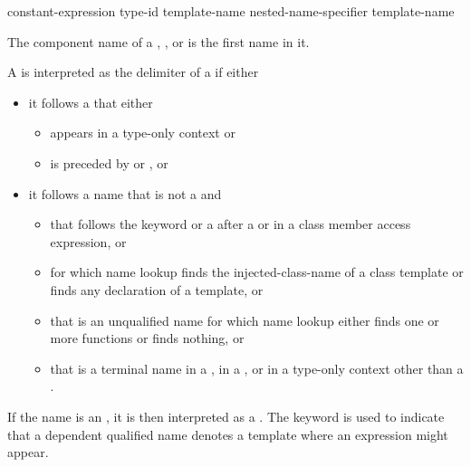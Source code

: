 \begin{bnf}
\br
  constant-expression\br
  type-id\br
   template-name\br
  nested-name-specifier  template-name
\end{bnf}

\pnum
{}%
The component name of a
,
, or
is the first name in it.

\pnum
A \tcode{<} is interpreted as the delimiter of
a 
if either
\begin{itemize}
\item
it follows a  that either
\begin{itemize}
\item appears in a type-only context or
\item is preceded by  or , or
\end{itemize}
\item
it follows a name that is not a  and
\begin{itemize}
\item
that follows the keyword  or a \tcode{\~}
after a  or
in a class member access expression, or
\item
for which name lookup finds the injected-class-name of a class template or
finds any declaration of a template, or
\item
that is an unqualified name
for which name lookup either finds one or more functions or finds nothing, or
\item
that is a terminal name
in a ,
in a , or
in a type-only context
other than a .
\end{itemize}
\end{itemize}
\begin{note}
If the name is an ,
it is then interpreted as a .
The keyword  is used to indicate
that a dependent qualified name denotes a template
where an expression might appear.
\end{note}
